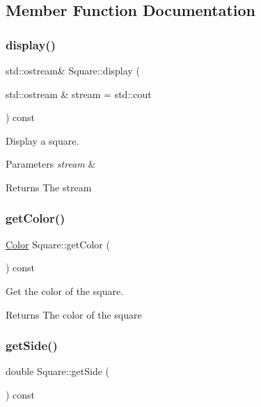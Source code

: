 \subsection{Member Function Documentation}
\mbox{\label{classSquare_a988cc14888f2a4f0b78ca48669431eb2}} 
\subsubsection{\texorpdfstring{display()}{display()}}
{\footnotesize\ttfamily std\+::ostream\& Square\+::display (\begin{DoxyParamCaption}\item[{std\+::ostream \&}]{stream = {\ttfamily std\+:\+:cout} }\end{DoxyParamCaption}) const}



Display a square. 


\begin{DoxyParams}{Parameters}
{\em stream} & \\
\hline
\end{DoxyParams}
\begin{DoxyReturn}{Returns}
The stream 
\end{DoxyReturn}
\mbox{\label{classSquare_addb6a08f2e427f06516f81349234165d}} 
\subsubsection{\texorpdfstring{get\+Color()}{getColor()}}
{\footnotesize\ttfamily \hyperlink{classColor}{Color} Square\+::get\+Color (\begin{DoxyParamCaption}{ }\end{DoxyParamCaption}) const}



Get the color of the square. 

\begin{DoxyReturn}{Returns}
The color of the square 
\end{DoxyReturn}
\mbox{\label{classSquare_ab670bd5d9126b09ebd7869670fb8f7c6}} 
\subsubsection{\texorpdfstring{get\+Side()}{getSide()}}
{\footnotesize\ttfamily double Square\+::get\+Side (\begin{DoxyParamCaption}{ }\end{DoxyParamCaption}) const}



